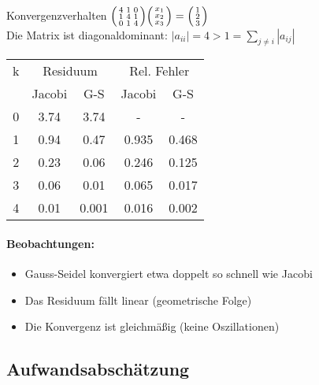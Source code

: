 \begin{example2}{Konvergenzverhalten}
$\begin{psmallmatrix}
4 & 1 & 0\\
1 & 4 & 1\\
0 & 1 & 4
\end{psmallmatrix}
\begin{psmallmatrix}
x_1\\
x_2\\
x_3
\end{psmallmatrix} =
\begin{psmallmatrix}
1\\
2\\
3
\end{psmallmatrix}$
\vspace{1mm}\\
\small
Die Matrix ist diagonaldominant:
$|a_{ii}| = 4 > 1 = \sum_{j\neq i} |a_{ij}|$
\vspace{1mm}\\
\begin{tabular}{c|cc|cc}
k & \multicolumn{2}{c|}{Residuum} & \multicolumn{2}{c}{Rel. Fehler}\\
& Jacobi & G-S & Jacobi & G-S\\
\hline
0 & 3.74 & 3.74 & - & -\\
1 & 0.94 & 0.47 & 0.935 & 0.468\\
2 & 0.23 & 0.06 & 0.246 & 0.125\\
3 & 0.06 & 0.01 & 0.065 & 0.017\\
4 & 0.01 & 0.001 & 0.016 & 0.002
\end{tabular}

\paragraph{Beobachtungen:}
\begin{itemize}
    \item Gauss-Seidel konvergiert etwa doppelt so schnell wie Jacobi
    \item Das Residuum fällt linear (geometrische Folge)
    \item Die Konvergenz ist gleichmäßig (keine Oszillationen)
\end{itemize}
\end{example2}

\subsection{Aufwandsabschätzung}

